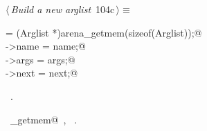 \documentclass[a4paper]{report}
\begin{document}
\begin{flushleft} \small
\begin{minipage}{\linewidth}\label{scrap219}\raggedright\small
{} $\langle\,${\it Build a new arglist}\nobreak\ {\footnotesize {104c}}$\,\rangle\equiv$
\vspace{-1ex}
\begin{list}{}{} \item
\mbox{}\verb@a = (Arglist *)arena_getmem(sizeof(Arglist));@\\
\mbox{}\verb@a->name = name;@\\
\mbox{}\verb@a->args = args;@\\
\mbox{}\verb@a->next = next;@{\NWsep}
\end{list}
\vspace{-1.5ex}
\footnotesize
\begin{list}{}{\setlength{\itemsep}{-\parsep}\setlength{\itemindent}{-\leftmargin}}
\item \NWtxtMacroRefIn\ .
\item \NWtxtIdentsUsed\nobreak\  \verb@arena_getmem@\nobreak\ , \verb@Arglist@\nobreak\ .
\item{}
\end{list}
\end{minipage}\vspace{4ex}
\end{flushleft}
\end{document}
